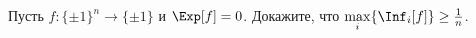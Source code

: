 Пусть $f\colon \{\pm 1\}^n \to \{\pm 1\}$ и $\Exp[f] = 0$. Докажите, что
$\max\limits_i \{\Inf_i[f]\} \ge \frac{1}{n}$. 